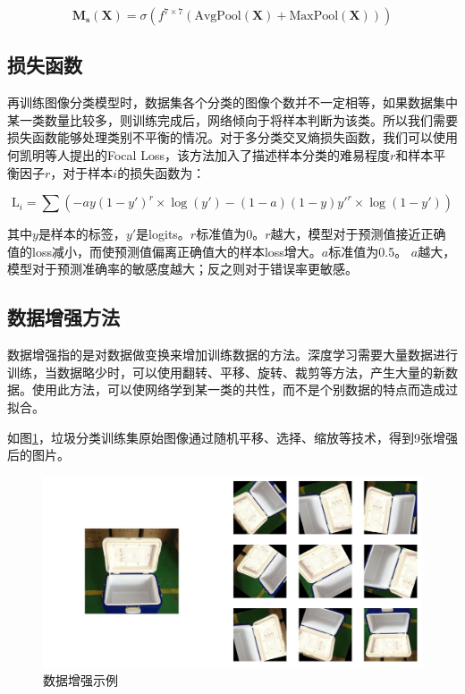 \documentclass[a4paper]{article}
\begin{document}
\begin{CJK*}{UTF8}{gbsn}
$$\mathbf{M_s}(\mathbf{X})=\sigma(\mathit{}{f}^{7\times 7}(\mathrm{AvgPool}(\mathbf{X})+\mathrm{MaxPool}(\mathbf{X})))$$

\subsection{损失函数}

再训练图像分类模型时，数据集各个分类的图像个数并不一定相等，如果数据集中某一类数量比较多，则训练完成后，网络倾向于将样本判断为该类。所以我们需要损失函数能够处理类别不平衡的情况。对于多分类交叉熵损失函数，我们可以使用何凯明等人提出的Focal Loss\cite{lin2017focal}，该方法加入了描述样本分类的难易程度$r$和样本平衡因子$r$，对于样本$i$的损失函数为：

$$\mathrm{L}_i=\sum(-ay(1-y')^r\times\log(y')-(1-a)(1-y)y'^r\times\log(1-y'))$$

其中$y$是样本的标签，$y'$是logits。$r$标准值为0。$r$越大，模型对于预测值接近正确值的loss减小，而使预测值偏离正确值大的样本loss增大。$a$标准值为0.5。 $a$越大，模型对于预测准确率的敏感度越大；反之则对于错误率更敏感。

\subsection{数据增强方法}

数据增强指的是对数据做变换来增加训练数据的方法。深度学习需要大量数据进行训练，当数据略少时，可以使用翻转、平移、旋转、裁剪等方法，产生大量的新数据。使用此方法，可以使网络学到某一类的共性，而不是个别数据的特点而造成过拟合。

如图\ref{fig:data_augment}，垃圾分类训练集原始图像通过随机平移、选择、缩放等技术，得到9张增强后的图片。

\begin{figure}[h!]
\centering
\includegraphics[scale=0.4]{data-augment.jpg}
\caption{数据增强示例}
\label{fig:data_augment}
\end{figure}


\end{CJK*}
\end{document}
